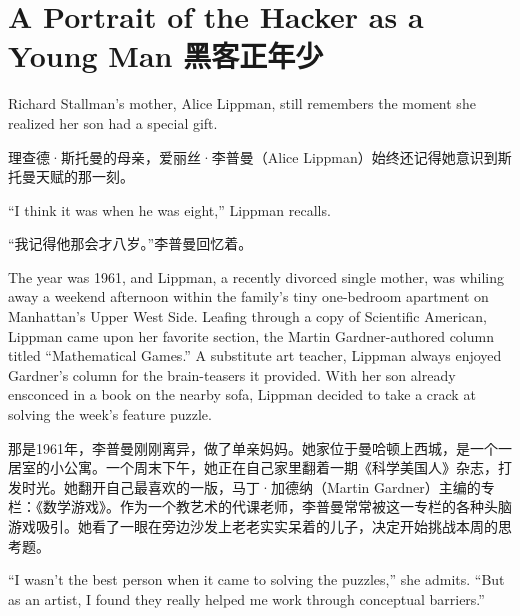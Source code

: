 
\chapter{\ifdefined\eng
A Portrait of the Hacker as a Young Man
\fi
\ifdefined\chs
黑客正年少
\fi}

\ifdefined\eng
Richard Stallman's mother, Alice Lippman, still remembers the moment she realized her son had a special gift.
\fi

\ifdefined\chs
理查德·斯托曼的母亲，爱丽丝·李普曼（Alice Lippman）始终还记得她意识到斯托曼天赋的那一刻。
\fi

\ifdefined\eng
``I think it was when he was eight,'' Lippman recalls.
\fi

\ifdefined\chs
``我记得他那会才八岁。''李普曼回忆着。
\fi

\ifdefined\eng
The year was 1961, and Lippman, a recently divorced single mother, was whiling away a weekend afternoon within the family's tiny one-bedroom apartment on Manhattan's Upper West Side. Leafing through a copy of Scientific American, Lippman came upon her favorite section, the Martin Gardner-authored column titled ``Mathematical Games.'' A substitute art teacher, Lippman always enjoyed Gardner's column for the brain-teasers it provided. With her son already ensconced in a book on the nearby sofa, Lippman decided to take a crack at solving the week's feature puzzle.
\fi

\ifdefined\chs
那是1961年，李普曼刚刚离异，做了单亲妈妈。她家位于曼哈顿上西城，是一个一居室的小公寓。一个周末下午，她正在自己家里翻着一期《科学美国人》杂志，打发时光。她翻开自己最喜欢的一版，马丁·加德纳（Martin Gardner）主编的专栏：《数学游戏》。作为一个教艺术的代课老师，李普曼常常被这一专栏的各种头脑游戏吸引。她看了一眼在旁边沙发上老老实实呆着的儿子，决定开始挑战本周的思考题。
\fi

\ifdefined\eng
``I wasn't the best person when it came to solving the puzzles,'' she admits. ``But as an artist, I found they really helped me work through conceptual barriers.''
\fi

